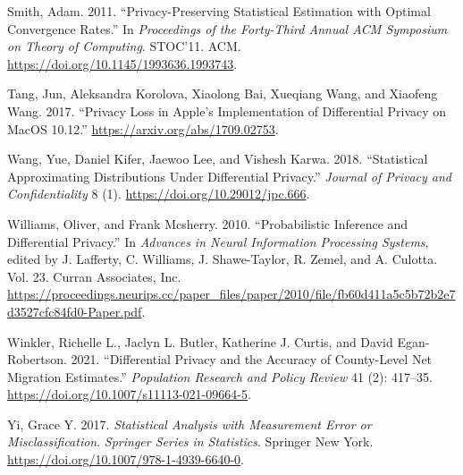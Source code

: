 \begin{CSLReferences}{1}{0}
\leavevmode{}%
Smith, Adam. 2011. {``Privacy-Preserving Statistical Estimation with Optimal Convergence Rates.''} In \emph{Proceedings of the Forty-Third Annual ACM Symposium on Theory of Computing}. STOC'11. ACM. \url{https://doi.org/10.1145/1993636.1993743}.

\leavevmode{}%
Tang, Jun, Aleksandra Korolova, Xiaolong Bai, Xueqiang Wang, and Xiaofeng Wang. 2017. {``Privacy Loss in Apple's Implementation of Differential Privacy on MacOS 10.12.''} \url{https://arxiv.org/abs/1709.02753}.

\leavevmode{}%
Wang, Yue, Daniel Kifer, Jaewoo Lee, and Vishesh Karwa. 2018. {``Statistical Approximating Distributions Under Differential Privacy.''} \emph{Journal of Privacy and Confidentiality} 8 (1). \url{https://doi.org/10.29012/jpc.666}.

\leavevmode{}%
Williams, Oliver, and Frank Mcsherry. 2010. {``Probabilistic Inference and Differential Privacy.''} In \emph{Advances in Neural Information Processing Systems}, edited by J. Lafferty, C. Williams, J. Shawe-Taylor, R. Zemel, and A. Culotta. Vol. 23. Curran Associates, Inc. \url{https://proceedings.neurips.cc/paper_files/paper/2010/file/fb60d411a5c5b72b2e7d3527cfc84fd0-Paper.pdf}.

\leavevmode{}%
Winkler, Richelle L., Jaclyn L. Butler, Katherine J. Curtis, and David Egan-Robertson. 2021. {``Differential Privacy and the Accuracy of County-Level Net Migration Estimates.''} \emph{Population Research and Policy Review} 41 (2): 417--35. \url{https://doi.org/10.1007/s11113-021-09664-5}.

\leavevmode{}%
Yi, Grace Y. 2017. \emph{Statistical Analysis with Measurement Error or Misclassification}. \emph{Springer Series in Statistics}. Springer New York. \url{https://doi.org/10.1007/978-1-4939-6640-0}.

\end{CSLReferences}


\address{%
Kevin Eng\\
Rutgers University\\%
Department of Statistics\\ Piscataway, NJ 08854\\
%
\url{https://www.britannica.com/animal/quokka}\\%
%
\href{mailto:ke157@stat.rutgers.edu}{\nolinkurl{ke157@stat.rutgers.edu}}%
}

